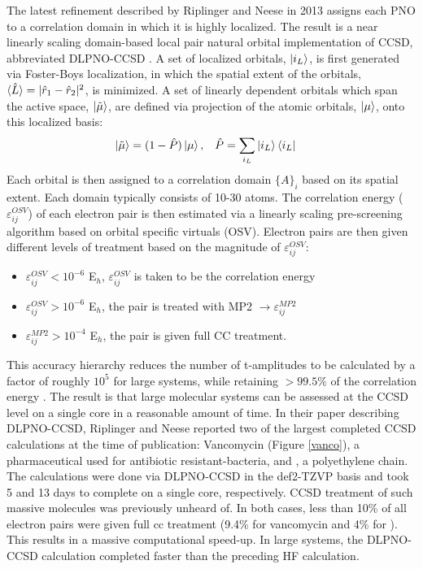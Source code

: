 \documentclass[letterpaper, 12pt]{article}
\begin{document}
The latest refinement described by Riplinger and Neese in 2013 assigns each PNO to a correlation domain in which it is highly localized. The result is a near linearly scaling domain-based local pair natural orbital implementation of CCSD, abbreviated DLPNO-CCSD \cite{DLPNOCC}. A set of localized orbitals, $\ket{i_L}$, is first generated via Foster-Boys localization, in which the spatial extent of the orbitals, $\braket{\hat{L}} = |\hat{r}_1 - \hat{r}_2|^2$, is minimized. A set of linearly dependent orbitals which span the active space, $\ket{\tilde{\mu}}$, are defined via projection of the atomic orbitals, $\ket{\mu}$, onto this localized basis:
\begin{align}
\ket{\tilde{\mu}} &= (1-\hat{P}) \ket{\mu}, &\hat{P} &= \sum_{i_L} \ket{i_L} \bra{i_L}
\end{align} 
Each orbital is then assigned to a correlation domain $\{A\}_i$ based on its spatial extent. Each domain typically consists of 10-30 atoms. The correlation energy ($\varepsilon^{OSV}_{ij}$) of each electron pair is then estimated via a linearly scaling pre-screening algorithm based on orbital specific virtuals (OSV). Electron pairs are then given different levels of treatment based on the magnitude of $\varepsilon^{OSV}_{ij}$:
\begin{itemize}
\item $\varepsilon^{OSV}_{ij} < 10^{-6}$ E$_h$, $\varepsilon^{OSV}_{ij}$ is taken to be the correlation energy
\item $\varepsilon^{OSV}_{ij} > 10^{-6}$ E$_h$, the pair is treated with MP2 $\rightarrow \varepsilon^{MP2}_{ij} $
\item $\varepsilon^{MP2}_{ij} > 10 ^{-4}$ E$_h$, the pair is given full CC treatment.
\end{itemize} 
This accuracy hierarchy reduces the number of t-amplitudes to be calculated by a factor of roughly $10^5$ for large systems, while retaining $> 99.5\%$ of the correlation energy \cite{DLPNOCC}. The result is that large molecular systems can be assessed at the CCSD level on a single core in a reasonable amount of time. In their paper describing DLPNO-CCSD, Riplinger and Neese reported two of the largest completed CCSD calculations at the time of publication: Vancomycin (Figure \ref{vanco}), a pharmaceutical used for antibiotic resistant-bacteria, and , a polyethylene chain. The calculations were done via DLPNO-CCSD in the def2-TZVP basis and took 5 and 13 days to complete on a single core, respectively. CCSD treatment of such massive molecules was previously unheard of. In both cases, less than 10\% of all electron pairs were given full cc treatment (9.4\% for vancomycin and 4\% for ). This results in a massive computational speed-up. In large systems, the DLPNO-CCSD calculation completed faster than the preceding HF calculation.
\end{document}
